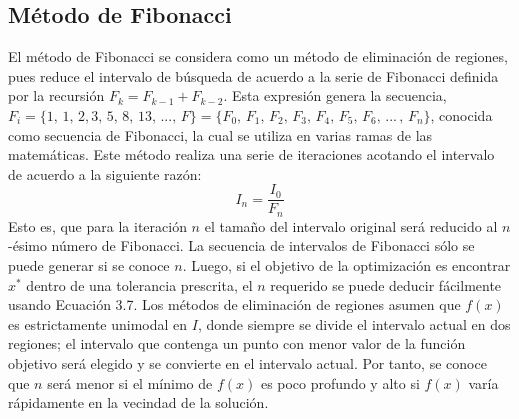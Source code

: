 \subsection{Método de Fibonacci }
El método de Fibonacci se considera como un método de eliminación de regiones, pues reduce el intervalo de búsqueda de acuerdo a la serie de Fibonacci definida por la recursión $F_k = F_{k-1} + F_{k-2}$.  Esta expresión genera la secuencia, $F_i= \{1,\, 1,\, 2, 3,\, 5,\, 8,\, 13,\, ...,\,F\} = \{F_0,\, F_1,\, F_2,\, F_3,\, F_4,\, F_5,\, F_6,\, ...\,,\,F_n \}$, conocida como secuencia de Fibonacci, la cual se utiliza en varias ramas de las matemáticas. Este método realiza una serie de iteraciones acotando el intervalo de acuerdo a la siguiente razón:
\begin{equation}
 I_n = \frac{I_0}{ F_n}
 \end{equation}
Esto es, que para la iteración $n$ el tamaño del intervalo original será reducido al $n$-ésimo número de Fibonacci. La secuencia de intervalos de Fibonacci sólo se puede generar si se conoce $n$. Luego, si el objetivo de la optimización es encontrar $x^*$ dentro de una tolerancia prescrita, el $n$ requerido se puede deducir fácilmente usando Ecuación 3.7. Los métodos de eliminación de regiones asumen que $f(x)$ es estrictamente unimodal en $I$, donde siempre se divide el intervalo actual en dos regiones; el intervalo que contenga un punto con menor valor de la función objetivo será elegido y se convierte en el intervalo actual. Por tanto, se conoce que $n$ será menor si el mínimo de $f(x)$ es poco profundo y alto si $f(x)$ varía rápidamente en la vecindad de la solución. 
